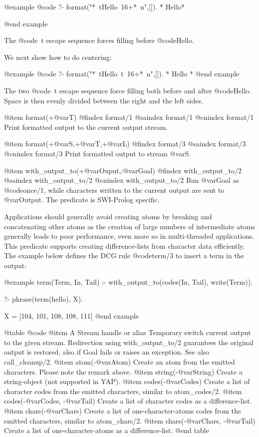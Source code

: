 {{{{{{@example
@code{
   ?- format("*~tHello~16+*~n",[]).
*          Hello*
}

@end example


The @code{~t} escape sequence forces filling before @code{Hello}. 

We next show how to do centering:

@example
@code{
   ?- format("*~tHello~t~16+*~n",[]).
*     Hello     *
}
@end example


The two @code{~t} escape sequence force filling both before and after
@code{Hello}. Space is then evenly divided between the right and the
left sides.


@item format(+@var{T})
@findex format/1
@saindex format/1
@cnindex format/1
Print formatted output to the current output stream.


@item format(+@var{S},+@var{T},+@var{L})
@findex format/3
@saindex format/3
@cnindex format/3
Print formatted output to stream @var{S}.

@item with_output_to(+@var{Ouput},:@var{Goal})
@findex with_output_to/2
@saindex with_output_to/2
@cnindex with_output_to/2
Run @var{Goal} as @code{once/1}, while characters written to the current
output are sent to @var{Output}. The predicate is SWI-Prolog
specific.

Applications should generally avoid creating atoms by breaking and
concatenating other atoms as the creation of large numbers of
intermediate atoms generally leads to poor performance, even more so in
multi-threaded applications. This predicate supports creating
difference-lists from character data efficiently. The example below
defines the DCG rule @code{term/3} to insert a term in the output:

@example
 term(Term, In, Tail) :-
        with_output_to(codes(In, Tail), write(Term)).

?- phrase(term(hello), X).

X = [104, 101, 108, 108, 111]
@end example

@table @code
@item A Stream handle or alias
    Temporary switch current output to the given stream. Redirection using with_output_to/2 guarantees the original output is restored, also if Goal fails or raises an exception. See also call_cleanup/2. 
@item atom(-@var{Atom})
    Create an atom from the emitted characters. Please note the remark above. 
@item string(-@var{String})
    Create a string-object (not supported in YAP). 
@item codes(-@var{Codes})
    Create a list of character codes from the emitted characters, similar to atom_codes/2. 
@item codes(-@var{Codes}, -@var{Tail})
    Create a list of character codes as a difference-list. 
@item chars(-@var{Chars})
    Create a list of one-character-atoms codes from the emitted characters, similar to atom_chars/2. 
@item chars(-@var{Chars}, -@var{Tail})
    Create a list of one-character-atoms as a difference-list. 
@end table

}}}}}}
